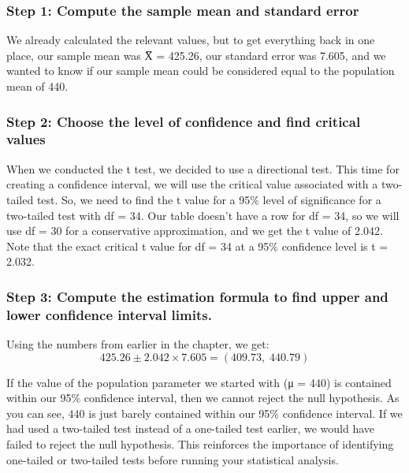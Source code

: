 \documentclass[
  letterpaper,
  DIV=11,
  numbers=noendperiod]{scrreprt}
\begin{document}
\subsubsection*{Step 1: Compute the sample mean and standard
error}\label{step-1-compute-the-sample-mean-and-standard-error-2}

We already calculated the relevant values, but to get everything back in
one place, our sample mean was X̅ = 425.26, our standard error was 7.605,
and we wanted to know if our sample mean could be considered equal to
the population mean of 440.

\subsubsection*{Step 2: Choose the level of confidence and find critical
values}\label{step-2-choose-the-level-of-confidence-and-find-critical-values-2}

When we conducted the t test, we decided to use a directional test. This
time for creating a confidence interval, we will use the critical value
associated with a two-tailed test. So, we need to find the t value for a
95\% level of significance for a two-tailed test with df = 34. Our table
doesn't have a row for df = 34, so we will use df = 30 for a
conservative approximation, and we get the t value of 2.042. Note that
the exact critical t value for df = 34 at a 95\% confidence level is t =
2.032.

\subsubsection*{Step 3: Compute the estimation formula to find upper and
lower confidence interval
limits.}\label{step-3-compute-the-estimation-formula-to-find-upper-and-lower-confidence-interval-limits.-1}

Using the numbers from earlier in the chapter, we get: \[
425.26 \pm 2.042 \times 7.605 = (409.73,\; 440.79)
\]

If the value of the population parameter we started with (μ = 440) is
contained within our 95\% confidence interval, then we cannot reject the
null hypothesis. As you can see, 440 is just barely contained within our
95\% confidence interval. If we had used a two-tailed test instead of a
one-tailed test earlier, we would have failed to reject the null
hypothesis. This reinforces the importance of identifying one-tailed or
two-tailed tests before running your statistical analysis.
\end{document}
